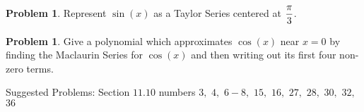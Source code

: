\documentclass[letterpaper, twoside, 12pt]{book}
\theoremstyle{definition}
\theoremstyle{definition}
\newtheorem{problem}[theorem]{Problem}
\newcommand{\ds}{\ensuremath{\displaystyle}}
\begin{document}
\newpage

\begin{problem}
 Represent $\sin\left(x\right)$ as a Taylor Series centered at $\ds \frac{\pi}{3}$.
\end{problem}

\vfill

\begin{problem}
 Give a polynomial which approximates $\cos(x)$ near $x=0$ by finding the
 Maclaurin Series for $\cos\left(x\right)$ and then writing out its first four
 non-zero terms.
\end{problem}

\vfill



\noindent Suggested Problems: Section $11.10$ numbers $3,$ $4,$ $6 - 8,$ $15,$ $16,$ $27,$ $28,$ $30,$ $32,$ $36$
\end{document}
